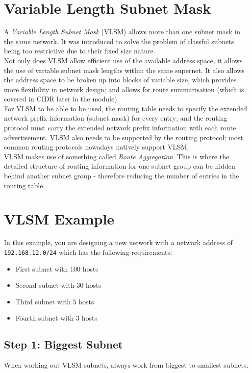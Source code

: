 
\section{Variable Length Subnet Mask}
A \textit{Variable Length Subnet Mask} (VLSM) allows more than one subnet mask in the same network. It was introduced to solve the problem of classful subnets being too restrictive due to their fixed size nature.\\

Not only does VLSM allow efficient use of the available address space, it allows the use of variable subnet mask lengths within the same supernet. It also allows the address space to be broken up into blocks of variable size, which provides more flexibility in network design; and allows for route summarisation (which is covered in CIDR later in the module).\\

For VLSM to be able to be used, the routing table needs to specify the extended network prefix information (subnet mask) for every entry; and the routing protocol must carry the extended network prefix information with each route advertisement. VLSM also needs to be supported by the routing protocol; most common routing protocols nowadays natively support VLSM.\\

VLSM makes use of something called \textit{Route Aggregation}. This is where the detailed structure of routing information for one subnet group can be hidden behind another subnet group - therefore reducing the number of entries in the routing table.

\section{VLSM Example}
In this example, you are designing a new network with a network address of \verb|192.168.12.0/24| which has the following requirements:
\begin{itemize}
    \item First subnet with 100 hosts
    \item Second subnet with 30 hosts
    \item Third subnet with 5 hosts
    \item Fourth subnet with 3 hosts
\end{itemize}

\subsection{Step 1: Biggest Subnet}
When working out VLSM subnets, always work from biggest to smallest subnets.\\

